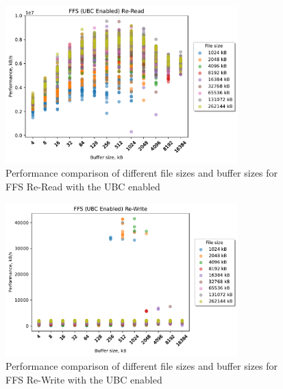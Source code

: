 \begin{figure}[!htb]
	\label{fig:bench_ffs_no_ubc_scatter_re-read}
	\begin{center}
		\includegraphics[width=0.8\textwidth]{figures.nosync/benchmarking/FFS/scatter-UBC Enabled-Re-Read.pdf}
	\end{center}
	\caption[Comparison of Re-Read performance for file size and buffer size for FFS with the UBC disabled]{Performance comparison of different file sizes and buffer sizes for FFS Re-Read with the UBC enabled}
\end{figure}
\begin{figure}[!htb]
	\label{fig:bench_ffs_no_ubc_scatter_re-write}
	\begin{center}
		\includegraphics[width=0.8\textwidth]{figures.nosync/benchmarking/FFS/scatter-UBC Enabled-Re-Write.pdf}
	\end{center}
	\caption[Comparison of Re-Write performance for file size and buffer size for FFS with the UBC disabled]{Performance comparison of different file sizes and buffer sizes for FFS Re-Write with the UBC enabled}
\end{figure}
\clearpage

